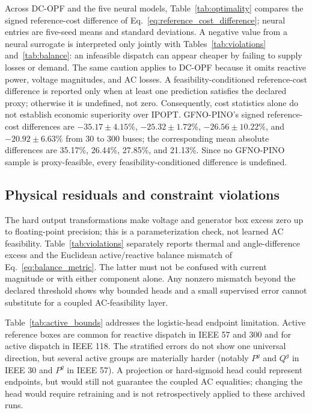 \documentclass[final,5p,times,twocolumn]{elsarticle}
\begin{document}
Across DC-OPF and the five neural models,
Table~\ref{tab:optimality} compares the signed reference-cost difference of
Eq.~\eqref{eq:reference_cost_difference}; neural entries are five-seed means
and standard deviations. A negative value from a neural surrogate
is interpreted only jointly with Tables~\ref{tab:violations}
and~\ref{tab:balance}: an infeasible dispatch can appear cheaper by failing to
supply losses or demand. The same
caution applies to DC-OPF because it omits reactive power, voltage magnitudes,
and AC losses. A feasibility-conditioned reference-cost difference is reported only when at
least one prediction satisfies the declared proxy; otherwise it is undefined,
not zero. Consequently, cost statistics alone do not establish economic
superiority over IPOPT. GFNO-PINO's signed reference-cost differences are
$-35.17\pm4.15\%$, $-25.32\pm1.72\%$, $-26.56\pm10.22\%$, and
$-20.92\pm6.63\%$ from 30 to 300 buses; the corresponding mean absolute
differences are 35.17\%, 26.44\%, 27.85\%, and 21.13\%. Since no GFNO-PINO sample is
proxy-feasible, every feasibility-conditioned difference is undefined.

\subsection{Physical residuals and constraint violations}






The hard output transformations make voltage and generator box excess zero up
to floating-point precision; this is a parameterization check, not learned AC
feasibility. Table~\ref{tab:violations} separately reports thermal and
angle-difference excess and the Euclidean active/reactive balance mismatch of
Eq.~\eqref{eq:balance_metric}. The latter must not be confused with current
magnitude or with either component alone. Any nonzero mismatch beyond the
declared threshold shows why bounded heads and a small supervised error cannot
substitute for a coupled AC-feasibility layer.

Table~\ref{tab:active_bounds} addresses the logistic-head endpoint limitation.
Active reference boxes are common for reactive dispatch in IEEE 57 and 300 and
for active dispatch in IEEE 118. The stratified errors do not show one
universal direction, but several active groups are materially harder (notably
$P^g$ and $Q^g$ in IEEE 30 and $P^g$ in IEEE 57). A projection or hard-sigmoid
head could represent endpoints, but would still not guarantee the coupled AC
equalities; changing the head would require retraining and is not retrospectively
applied to these archived runs.
\end{document}
